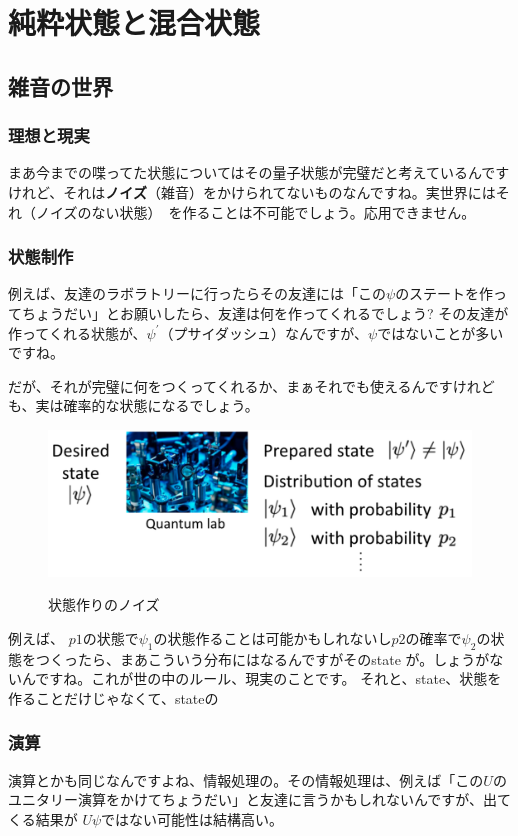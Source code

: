 \chapter[純粋状態と混合状態]
{純粋状態と混合状態}

\section{雑音の世界}
\subsection{理想と現実}
まあ今までの喋ってた状態についてはその量子状態が完璧だと考えているんですけれど、それは\textbf{ノイズ}（雑音）をかけられてないものなんですね。実世界にはそれ（ノイズのない状態）　を作ることは不可能でしょう。応用できません。
\subsection{状態制作}
例えば、友達のラボラトリーに行ったらその友達には「この$\psi$のステートを作ってちょうだい」とお願いしたら、友達は何を作ってくれるでしょう?
その友達が作ってくれる状態が、$\psi^\prime$（プサイダッシュ）なんですが、$\psi$ではないことが多いですね。

だが、それが完璧に何をつくってくれるか、まぁそれでも使えるんですけれども、実は確率的な状態になるでしょう。
\begin{figure}[H]
    \centering
    \includegraphics[width=1.0\textwidth]{lesson3/state_creation.pdf}
    \label{fig: 1}
    \begin{center}
        \caption{状態作りのノイズ}
    \end{center}
\end{figure}
例えば、 $p1$の状態で$\psi_1$の状態作ることは可能かもしれないし$p2$の確率で$\psi_2$の状態をつくったら、まあこういう分布にはなるんですがそのstate が。しょうがないんですね。これが世の中のルール、現実のことです。
それと、state、状態を作ることだけじゃなくて、stateの
\subsection{演算}
演算とかも同じなんですよね、情報処理の。その情報処理は、例えば「この$U$のユニタリー演算をかけてちょうだい」と友達に言うかもしれないんですが、出てくる結果が
$U\psi$ではない可能性は結構高い。

